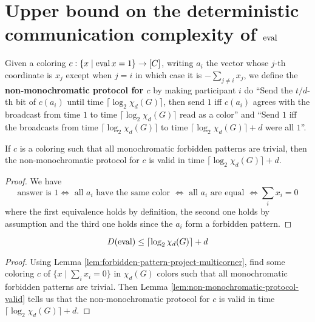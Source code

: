 \chapter{Upper bound on the deterministic communication complexity of \texorpdfstring{$\operatorname{eval}$}{eval}}

\begin{definition}
  \label{def:non-monochromatic-protocol}

  Given a coloring $c : \{x \mid \operatorname{eval} x = 1\} \to [C]$, writing $a_i$ the vector whose $j$-th coordinate is $x_j$ except when $j = i$ in which case it is $-\sum_{j \ne i} x_j$, we define the {\bf non-monochromatic protocol for $c$} by making participant $i$ do ``Send the $t / d$-th bit of $c(a_i)$ until time $\lceil\log_2\chi_d(G)\rceil$, then send $1$ iff $c(a_i)$ agrees with the broadcast from time $1$ to time $\lceil\log_2\chi_d(G)\rceil$ read as a color'' and ``Send $1$ iff the broadcasts from time $\lceil\log_2\chi_d(G)\rceil$ to time $\lceil\log_2\chi_d(G)\rceil + d$ were all $1$''.
\end{definition}

\begin{lemma}
  \label{lem:non-monochromatic-protocol-valid}

  If $c$ is a coloring such that all monochromatic forbidden patterns are trivial, then the non-monochromatic protocol for $c$ is valid in time $\lceil\log_2\chi_d(G)\rceil + d$.
\end{lemma}
\begin{proof}
  \uses{}

  We have
  $$\text{answer is } 1 \iff \text{ all $a_i$ have the same color } \iff \text{ all $a_i$ are equal } \iff \sum_i x_i = 0$$
  where the first equivalence holds by definition, the second one holds by assumption and the third one holds since the $a_i$ form a forbidden pattern.
\end{proof}

\begin{theorem}
  \label{thm:det-complex-eval-le-corner-color-num}

  $$D(\operatorname{eval}) \le \lceil\log_2\chi_d(G)\rceil + d$$
\end{theorem}
\begin{proof}

  Using Lemma \ref{lem:forbidden-pattern-project-multicorner}, find some coloring $c$ of $\{x \mid \sum_i x_i = 0\}$ in $\chi_d(G)$ colors such that all monochromatic forbidden patterns are trivial. Then Lemma \ref{lem:non-monochromatic-protocol-valid} tells us that the non-monochromatic protocol for $c$ is valid in time $\lceil\log_2\chi_d(G)\rceil + d$.
\end{proof}

